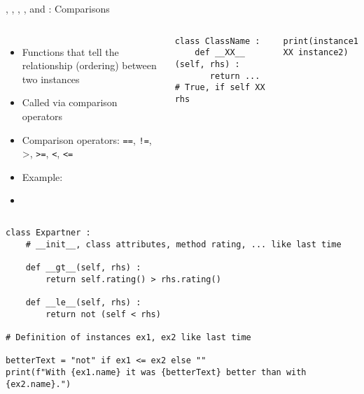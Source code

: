 
\begin{frame}[fragile]{, , , ,  and : Comparisons}
%
\begin{columns}[T]
\begin{itemize}
\item Functions that tell the relationship (ordering) between two instances
\item Called via comparison operators
\item Comparison operators: \texttt{==}, \texttt{!=}, >, \texttt{>=}, \texttt{<}, \texttt{<=}
\item Example:  
\item[\Thus] 
\end{itemize}
%
\begin{codebox}
\begin{verbatim}
class ClassName :
    def __XX__ (self, rhs) :
       return ... # True, if self XX rhs
\end{verbatim}
\end{codebox}
%
\begin{codebox}
\begin{verbatim}
print(instance1 XX instance2)
\end{verbatim}
\end{codebox}
\end{columns}
%
\end{frame}


\begin{frame}[fragile]
%
\begin{codebox}
\begin{verbatim}
class Expartner :
    # __init__, class attributes, method rating, ... like last time
    
    def __gt__(self, rhs) :
        return self.rating() > rhs.rating()
    
    def __le__(self, rhs) :
        return not (self < rhs)

# Definition of instances ex1, ex2 like last time

betterText = "not" if ex1 <= ex2 else ""
print(f"With {ex1.name} it was {betterText} better than with {ex2.name}.")
\end{verbatim}
\end{codebox}
%
\end{frame}

